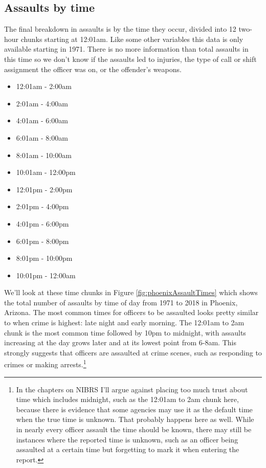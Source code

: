 \documentclass[
]{krantz}
\providecommand{\tightlist}{%
  \setlength{\itemsep}{0pt}\setlength{\parskip}{0pt}}
\begin{document}
\subsection{Assaults by time}\label{assaults-by-time}

The final breakdown in assaults is by the time they occur,
divided into 12 two-hour chunks starting at 12:01am. Like
some other variables this data is only available starting in
1971. There is no more information than total assaults in
this time so we don't know if the assaults led to injuries,
the type of call or shift assignment the officer was on, or
the offender's weapons.

\begin{itemize}
\tightlist
\item
  12:01am - 2:00am
\item
  2:01am - 4:00am
\item
  4:01am - 6:00am
\item
  6:01am - 8:00am
\item
  8:01am - 10:00am
\item
  10:01am - 12:00pm
\item
  12:01pm - 2:00pm
\item
  2:01pm - 4:00pm
\item
  4:01pm - 6:00pm
\item
  6:01pm - 8:00pm
\item
  8:01pm - 10:00pm
\item
  10:01pm - 12:00am
\end{itemize}

We'll look at these time chunks in Figure
\ref{fig:phoenixAssaultTimes} which shows the total number
of assaults by time of day from 1971 to 2018 in Phoenix,
Arizona. The most common times for officers to be assaulted
looks pretty similar to when crime is highest: late night
and early morning. The 12:01am to 2am chunk is the most
common time followed by 10pm to midnight, with assaults
increasing at the day grows later and at its lowest point
from 6-8am. This strongly suggests that officers are
assaulted at crime scenes, such as responding to crimes or
making arrests.\footnote{In the chapters on NIBRS I'll argue
  against placing too much trust about time which includes
  midnight, such as the 12:01am to 2am chunk here, because
  there is evidence that some agencies may use it as the
  default time when the true time is unknown. That probably
  happens here as well. While in nearly every officer
  assault the time should be known, there may still be
  instances where the reported time is unknown, such as an
  officer being assaulted at a certain time but forgetting
  to mark it when entering the report.}
\end{document}
